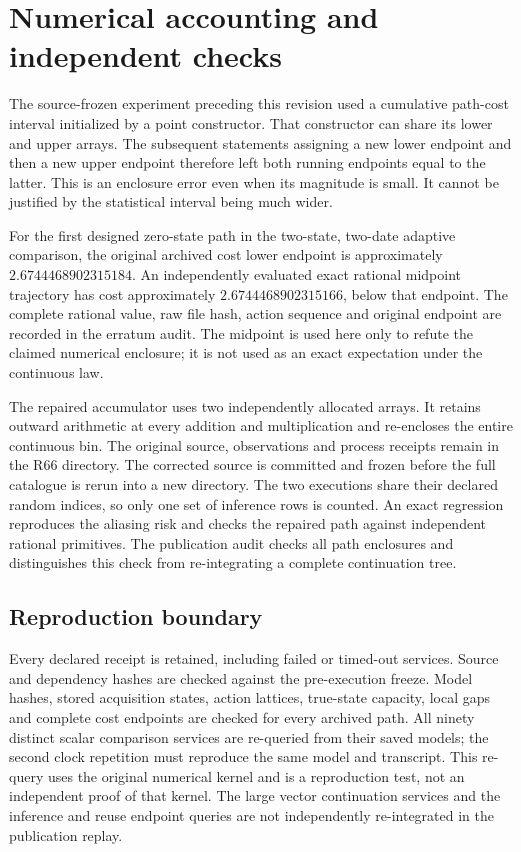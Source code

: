 \section{Numerical accounting and independent checks}\label{supp:accounting67}
The source-frozen experiment preceding this revision used a cumulative path-cost interval initialized by a point constructor. That constructor can share its lower and upper arrays. The subsequent statements assigning a new lower endpoint and then a new upper endpoint therefore left both running endpoints equal to the latter. This is an enclosure error even when its magnitude is small. It cannot be justified by the statistical interval being much wider.

For the first designed zero-state path in the two-state, two-date adaptive comparison, the original archived cost lower endpoint is approximately $2.6744468902315184$. An independently evaluated exact rational midpoint trajectory has cost approximately $2.6744468902315166$, below that endpoint. The complete rational value, raw file hash, action sequence and original endpoint are recorded in the erratum audit. The midpoint is used here only to refute the claimed numerical enclosure; it is not used as an exact expectation under the continuous law.

The repaired accumulator uses two independently allocated arrays. It retains outward arithmetic at every addition and multiplication and re-encloses the entire continuous bin. The original source, observations and process receipts remain in the R66 directory. The corrected source is committed and frozen before the full catalogue is rerun into a new directory. The two executions share their declared random indices, so only one set of inference rows is counted. An exact regression reproduces the aliasing risk and checks the repaired path against independent rational primitives. The publication audit checks all path enclosures and distinguishes this check from re-integrating a complete continuation tree.

\subsection{Reproduction boundary}
Every declared receipt is retained, including failed or timed-out services. Source and dependency hashes are checked against the pre-execution freeze. Model hashes, stored acquisition states, action lattices, true-state capacity, local gaps and complete cost endpoints are checked for every archived path. All ninety distinct scalar comparison services are re-queried from their saved models; the second clock repetition must reproduce the same model and transcript. This re-query uses the original numerical kernel and is a reproduction test, not an independent proof of that kernel. The large vector continuation services and the inference and reuse endpoint queries are not independently re-integrated in the publication replay.

